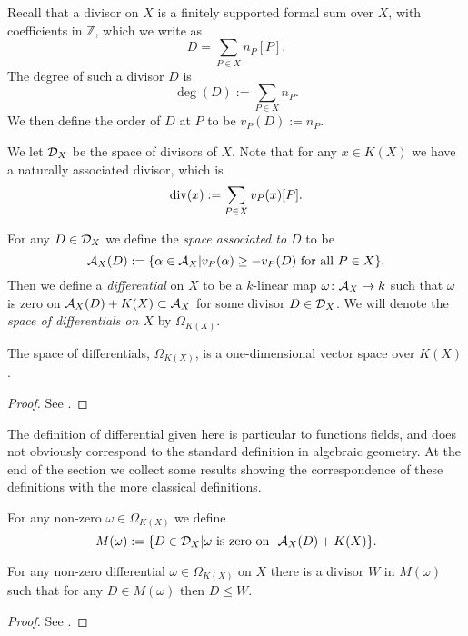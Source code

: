 Recall that a divisor on $X$ is a finitely supported formal sum over $X$, with coefficients in $\mathbb Z$, which we write as 
    \[
    D = \sum_{P\in X} n_P [P].
    \]
The degree of such a divisor $D$ is 
    \[
    \deg(D) := \sum_{P\in X} n_P.
    \]
We then define the order of $D$ at $P$ to be $v_P(D) := n_P$.

We let ${\mathcal D}_X$ be the space of divisors of $X$.
Note that for any $x\in K(X)$ we have a naturally associated divisor, which is
    \[
    \operatorname{div}(x) := \sum_{P\in X} v_P(x) [P].
    \]

For any $D\in {\mathcal D}_X$ we define the {\em \adele space associated to $D$} to be
    \[
    {\mathcal A}_X(D):=\{\alpha \in {\mathcal A}_X | v_P(\alpha) \geq -v_P(D)\ \text{for all} \ P\in X\}.
    \]
Then we define a {\em differential} on $X$ to be a $k$-linear map $\omega\colon  {\mathcal A}_X \rightarrow k$ such that $\omega$ is zero on ${\mathcal A}_X(D) +K(X) \subset {\mathcal A}_X$ for some divisor $D\in {\mathcal D}_X$.
We will denote the {\em space of differentials on $X$} by $\Omega_{K(X)}$.
    
    \begin{prop}
    The space of differentials, $\Omega_{K(X)}$, is a one-dimensional vector space over $K(X)$.
    \end{prop}
    \begin{proof}
    See \cite[Prop. 1.5.9]{stichtenoth}.
    \end{proof}

    \begin{rem}
    The definition of differential given here is particular to functions fields, and does not obviously correspond to the standard definition in algebraic geometry.
    At the end of the section we collect some results showing the correspondence of these definitions with the more classical definitions.
    \end{rem}

For any non-zero $\omega \in \Omega_{K(X)}$ we define
    \[
    M(\omega) := \{ D\in {\mathcal D}_X | \omega \ \text{is zero on }\ {\mathcal A}_X(D) + K(X)\}.
    \]

    \begin{lem}\label{lemmamaximaldivisorassociatedtoomega}
    For any non-zero differential $\omega \in \Omega_{K(X)}$ on $X$ there is a divisor $W$ in $M(\omega)$ such that for any $D \in M( \omega)$ then $D \leq W$.
    \end{lem}
    \begin{proof}
    See \cite[Lem. 1.5.10]{stichtenoth}.
    \end{proof}

